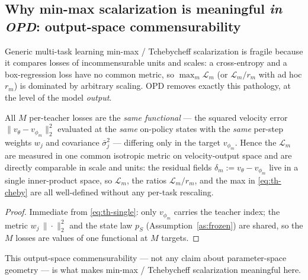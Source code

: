 \subsection{Why min-max scalarization is meaningful \emph{in OPD}: output-space commensurability}
\label{sec:th-geometry}

Generic multi-task learning min-max / Tchebycheff scalarization is fragile because it
compares losses of incommensurable units and scales: a cross-entropy and a box-regression
loss have no common metric, so $\max_m \mathcal L_m$ (or $\mathcal L_m/r_m$ with ad hoc
$r_m$) is dominated by arbitrary scaling. OPD removes exactly this pathology, at the level
of the model \emph{output}.

\begin{proposition}
\label{prop:commens}
All $M$ per-teacher losses are the \emph{same functional} --- the squared velocity error
$\|v_\theta-v_{\phi_m}\|_2^2$ evaluated at the \emph{same} on-policy states with the
\emph{same} per-step weights $w_j$ and covariance $\bar\sigma_j^2$ --- differing only in
the target $v_{\phi_m}$. Hence the $\mathcal L_m$ are measured in one common isotropic
metric on velocity-output space and are directly comparable in scale and units: the
residual fields $\delta_m:=v_\theta-v_{\phi_m}$ live in a single inner-product space, so
$\mathcal L_m$, the ratios $\mathcal L_m/r_m$, and the max in \eqref{eq:th-cheby} are all
well-defined without any per-task rescaling.
\end{proposition}

\begin{proof}
Immediate from \eqref{eq:th-single}: only $v_{\phi_m}$ carries the teacher index; the
metric $w_j\,\|\cdot\|_2^2$ and the state law $p_S$ (Assumption~\ref{as:frozen}) are
shared, so the $M$ losses are values of one functional at $M$ targets.
\end{proof}

This output-space commensurability --- not any claim about parameter-space geometry ---
is what makes min-max / Tchebycheff scalarization meaningful here.

